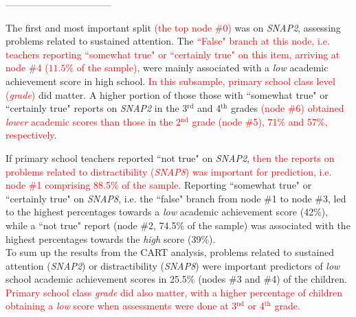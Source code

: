 \documentclass[10pt,letterpaper]{article}
\begin{document}
{{\begin{center}
---------------------------------\\
\end{center}
  
\vspace{3mm}
  
 The first and most important split \textcolor{red}{(the top node \#0)} was on {\it SNAP2}, 
 assessing problems related to sustained attention. The \textcolor{red}{``False" branch at this node, i.e. teachers reporting ``somewhat true" or ``certainly true" on this item, 
 arriving at node \#4  ($11.5$\% of the sample),} were 
 mainly associated with a {\it low} academic achievement score in high school. 
 \textcolor{red}{In this subsample, primary school class level ({\it grade})} did matter. 
 A higher portion of those those with ``somewhat true" or ``certainly true" 
 reports on {\it SNAP2} in the 3$^{\text{rd}}$ and 4$^{\text{th}}$ grades  \textcolor{red}{(node \#6) obtained {\it lower} academic scores than those in 
 the 2$^{\text{nd}}$ grade (node \#5), 71\% and 57\%, respectively}. 

 
If primary school teachers reported ``not true" on {\it SNAP2},  \textcolor{red}{then the reports on problems related to distractibility ({\it SNAP8}) was important for prediction, 
i.e. node \#1 comprising 88.5\% of the sample.} 
Reporting ``somewhat true" or ``certainly true"  on {\it SNAP8}, i.e. the ``false" branch from node \#1 to node \#3, led to the highest percentages towards a {\it low} 
academic achievement score (42\%), while a ``not true" report (node \#2, 74.5\% of the sample) was associated with the highest percentages towards the {\it high} score (39\%). \\
	
To sum up the results from the CART analysis, problems related to sustained attention ({\it SNAP2}) or distractibility ({\it SNAP8}) were important predictors of {\it low} school 
academic achievement scores in  25.5\% (nodes \#3 and \#4) of the children.  \textcolor{red}{Primary school class {\it grade} did also matter, with a higher percentage of children 
obtaining a {\it low} score when assessments were done at 3$^{\text{nd}}$ or 4$^{\text{th}}$ grade.}  \\ 

}}
\end{document}
